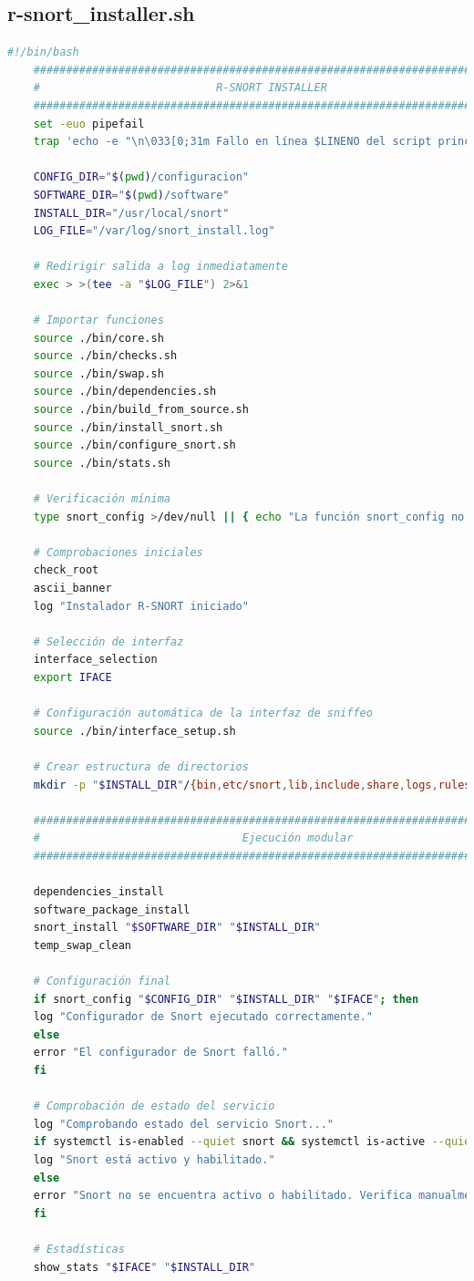 \documentclass[11pt,a4paper,twoside]{report}
\begin{document}
\subsection*{r-snort\_installer.sh}
\begin{lstlisting}[language=bash, caption={\texttt{r-snort\_installer.sh}}, label={lst:r-snort-installer}]
	#!/bin/bash
	###############################################################################
	#                           R-SNORT INSTALLER                                 #
	###############################################################################
	set -euo pipefail
	trap 'echo -e "\n\033[0;31m Fallo en línea $LINENO del script principal\033[0m"' ERR
	
	CONFIG_DIR="$(pwd)/configuracion"
	SOFTWARE_DIR="$(pwd)/software"
	INSTALL_DIR="/usr/local/snort"
	LOG_FILE="/var/log/snort_install.log"
	
	# Redirigir salida a log inmediatamente
	exec > >(tee -a "$LOG_FILE") 2>&1
	
	# Importar funciones
	source ./bin/core.sh
	source ./bin/checks.sh
	source ./bin/swap.sh
	source ./bin/dependencies.sh
	source ./bin/build_from_source.sh
	source ./bin/install_snort.sh
	source ./bin/configure_snort.sh
	source ./bin/stats.sh
	
	# Verificación mínima
	type snort_config >/dev/null || { echo "La función snort_config no está disponible"; exit 1; }
	
	# Comprobaciones iniciales
	check_root
	ascii_banner
	log "Instalador R-SNORT iniciado"
	
	# Selección de interfaz
	interface_selection
	export IFACE
	
	# Configuración automática de la interfaz de sniffeo
	source ./bin/interface_setup.sh
	
	# Crear estructura de directorios
	mkdir -p "$INSTALL_DIR"/{bin,etc/snort,lib,include,share,logs,rules}
	
	###############################################################################
	#                               Ejecución modular                             #
	###############################################################################
	
	dependencies_install
	software_package_install
	snort_install "$SOFTWARE_DIR" "$INSTALL_DIR"
	temp_swap_clean
	
	# Configuración final
	if snort_config "$CONFIG_DIR" "$INSTALL_DIR" "$IFACE"; then
	log "Configurador de Snort ejecutado correctamente."
	else
	error "El configurador de Snort falló."
	fi
	
	# Comprobación de estado del servicio
	log "Comprobando estado del servicio Snort..."
	if systemctl is-enabled --quiet snort && systemctl is-active --quiet snort; then
	log "Snort está activo y habilitado."
	else
	error "Snort no se encuentra activo o habilitado. Verifica manualmente con: systemctl status snort"
	fi
	
	# Estadísticas
	show_stats "$IFACE" "$INSTALL_DIR"
\end{lstlisting}
\end{document}
